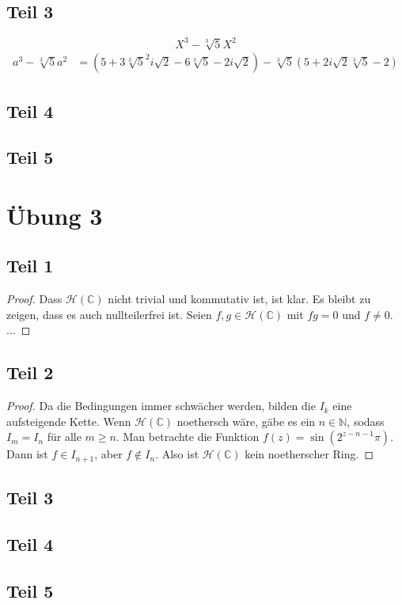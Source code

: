 \documentclass[10pt,a4paper]{article}
\begin{document}
\subsection{Teil 3}

\begin{equation}
  X^{3} - \sqrt[3]{5}X^{2}
\end{equation}
\begin{align*}
  a^{3} - \sqrt[3]{5}a^{2} & = (5 + 3\sqrt[3]{5}^{2}i\sqrt{2} - 6\sqrt[3]{5} - 2i\sqrt{2}) - \sqrt[3]{5}(5 + 2i\sqrt{2}\sqrt[3]{5} - 2)
\end{align*}

\subsection{Teil 4}

\subsection{Teil 5}

\section{Übung 3}

\subsection{Teil 1}

\begin{proof}
  Dass $\mathcal{H}(\mathbb{C})$ nicht trivial und kommutativ ist, ist klar.
  Es bleibt zu zeigen, dass es auch nullteilerfrei ist.
  Seien $f, g \in \mathcal{H}(\mathbb{C})$ mit $fg = 0$ und $f \ne 0$.
  ...
\end{proof}

\subsection{Teil 2}

\begin{proof}
  Da die Bedingungen immer schwächer werden, bilden die $I_{k}$ eine aufsteigende Kette.
  Wenn $\mathcal{H}(\mathbb{C})$ noethersch wäre, gäbe es ein $n \in \mathbb{N}$, sodass $I_{m} = I_{n}$ für alle $m \ge n$.
  Man betrachte die Funktion $f(z) = \sin(2^{z - n - 1}\pi)$.
  Dann ist $f \in I_{n + 1}$, aber $f \not\in I_{n}$.
  Also ist $\mathcal{H}(\mathbb{C})$ kein noetherscher Ring.
\end{proof}

\subsection{Teil 3}

\subsection{Teil 4}

\subsection{Teil 5}
\end{document}
